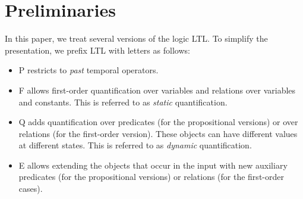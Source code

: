 \section{Preliminaries}
\label{sec:prelim}

In this paper, we treat several versions of the logic LTL. To simplify
the presentation, we prefix LTL with letters as follows:

\begin{itemize}
\item{P} restricts to {\em past} temporal operators.
\item{F} allows first-order quantification over
variables and relations over variables and constants. This is referred to as {\em static} quantification.
\item{Q} adds quantification over predicates (for the propositional versions)
or over relations (for the first-order version). These objects can have different values at different states. This is referred to as {\em dynamic} quantification.
\item{E} allows extending the objects that occur in the input with
new auxiliary predicates (for the propositional versions) or relations (for the first-order cases).
\end{itemize}


